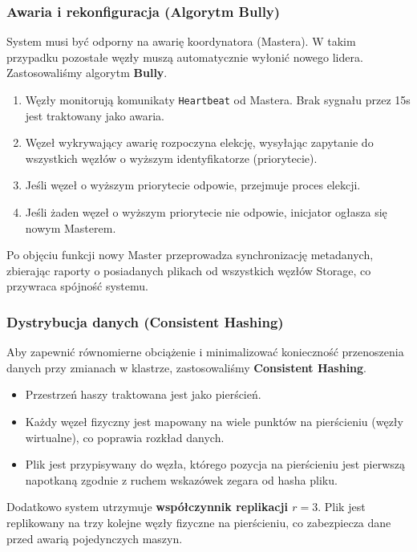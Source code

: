\documentclass[12pt,a4paper]{article}
\begin{document}
	\subsubsection{Awaria i rekonfiguracja (Algorytm Bully)}
	System musi być odporny na awarię koordynatora (Mastera). W takim przypadku pozostałe węzły muszą automatycznie wyłonić nowego lidera. Zastosowaliśmy algorytm \textbf{Bully}.
	
	\begin{enumerate}
		\item Węzły monitorują komunikaty \texttt{Heartbeat} od Mastera. Brak sygnału przez 15s jest traktowany jako awaria.
		\item Węzeł wykrywający awarię rozpoczyna elekcję, wysyłając zapytanie do wszystkich węzłów o wyższym identyfikatorze (priorytecie).
		\item Jeśli węzeł o wyższym priorytecie odpowie, przejmuje proces elekcji.
		\item Jeśli żaden węzeł o wyższym priorytecie nie odpowie, inicjator ogłasza się nowym Masterem.
	\end{enumerate}
	Po objęciu funkcji nowy Master przeprowadza synchronizację metadanych, zbierając raporty o posiadanych plikach od wszystkich węzłów Storage, co przywraca spójność systemu.

	\subsubsection{Dystrybucja danych (Consistent Hashing)}
	Aby zapewnić równomierne obciążenie i minimalizować konieczność przenoszenia danych przy zmianach w klastrze, zastosowaliśmy \textbf{Consistent Hashing}.
	
	\begin{itemize}
		\item Przestrzeń haszy traktowana jest jako pierścień.
		\item Każdy węzeł fizyczny jest mapowany na wiele punktów na pierścieniu (węzły wirtualne), co poprawia rozkład danych.
		\item Plik jest przypisywany do węzła, którego pozycja na pierścieniu jest pierwszą napotkaną zgodnie z ruchem wskazówek zegara od hasha pliku.
	\end{itemize}
	Dodatkowo system utrzymuje \textbf{współczynnik replikacji $r=3$}. Plik jest replikowany na trzy kolejne węzły fizyczne na pierścieniu, co zabezpiecza dane przed awarią pojedynczych maszyn.
\end{document}
